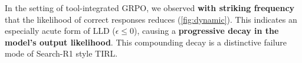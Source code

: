 \vspace{-3mm}
In the setting of tool-integrated GRPO,  we observed \textbf{with striking frequency} that the likelihood of correct responses reduces (\cref{fig:dynamic}). This indicates an especially acute form of LLD ($\epsilon \leq 0$), causing a \textbf{progressive decay in the model’s output likelihood}. This compounding decay is a distinctive failure mode of Search-R1 style TIRL.